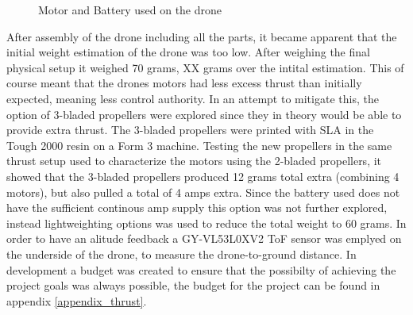 \begin{figure}[H]%
    \centering
    \qquad
    \caption{Motor and Battery used on the drone}%
    \label{fig:example}%
\end{figure}

After assembly of the drone including all the parts, it became apparent that the initial weight estimation of the drone was too low. After weighing the final physical setup it weighed 70 grams, XX grams over the intital estimation. This of course meant that the drones motors had less excess thrust than initially expected, meaning less control authority. In an attempt to mitigate this, the option of 3-bladed propellers were explored since they in theory would be able to provide extra thrust. The 3-bladed propellers were printed with SLA in the Tough 2000 resin on a Form 3 machine. Testing the new propellers in the same thrust setup used to characterize the motors using the 2-bladed propellers, it showed that the 3-bladed propellers produced 12 grams total extra (combining 4 motors), but also pulled a total of 4 amps extra. Since the battery used does not have the sufficient continous amp supply this option was not further explored, instead lightweighting options was used to reduce the total weight to 60 grams. In order to have an alitude feedback a GY-VL53L0XV2 ToF sensor was emplyed on the underside of the drone, to measure the drone-to-ground distance. In development a budget was created to ensure that the possibilty of achieving the project goals was always possible, the budget for the project can be found in appendix \ref{appendix_thrust}.
